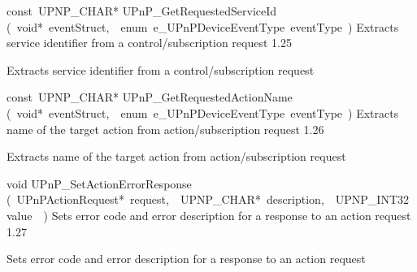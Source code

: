 \documentclass{article}
\begin{document}
\begin{cxxentry}
\begin{cxxfunction}
\begin{cxxdoc}
\end{cxxdoc}
\end{cxxfunction}
\begin{cxxfunction}
{const\ UPNP\_CHAR*}
        {UPnP\_GetRequestedServiceId}
        {(\ void*\ eventStruct,\ \ enum\ e\_UPnPDeviceEventType\ eventType\ )}
        {Extracts service identifier from a control/subscription request}
        {1.25}
\begin{cxxdoc}
Extracts service identifier from a control/subscription request


\end{cxxdoc}
\end{cxxfunction}
\begin{cxxfunction}
{const\ UPNP\_CHAR*}
        {UPnP\_GetRequestedActionName}
        {(\ void*\ eventStruct,\ \ enum\ e\_UPnPDeviceEventType\ eventType\ )}
        {Extracts name of the target action from action/subscription request}
        {1.26}
\begin{cxxdoc}
Extracts name of the target action from action/subscription request


\end{cxxdoc}
\end{cxxfunction}
\begin{cxxfunction}
{void}
        {UPnP\_SetActionErrorResponse}
        {(\ UPnPActionRequest*\ request,\ \ UPNP\_CHAR*\ description,\ \ UPNP\_INT32\ value\ \ )}
        {Sets error code and error description for a response to an action request}
        {1.27}
\begin{cxxdoc}
Sets error code and error description for a response to an action request



\end{cxxdoc}
\end{cxxfunction}
\end{cxxentry}
\end{document}
